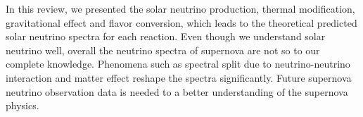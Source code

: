 In this review, we presented the solar neutrino production, thermal modification, gravitational effect and flavor conversion, which leads to the theoretical predicted solar neutrino spectra for each reaction. Even though we understand solar neutrino well, overall the neutrino spectra of supernova are not so to our complete knowledge. Phenomena such as spectral split due to neutrino-neutrino interaction and matter effect reshape the spectra significantly. Future supernova neutrino observation data is needed to a better understanding of the supernova physics.



